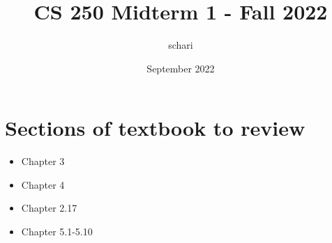 \documentclass{article}
\title{CS 250 Midterm 1 - Fall 2022}
\author{schari}
\date{September 2022}
\begin{document}
	\maketitle

	\section{Sections of textbook to review}
	\begin{itemize}
		\item Chapter 3
		\item Chapter 4
		\item Chapter 2.17
		\item Chapter 5.1-5.10
	\end{itemize}
\end{document}
